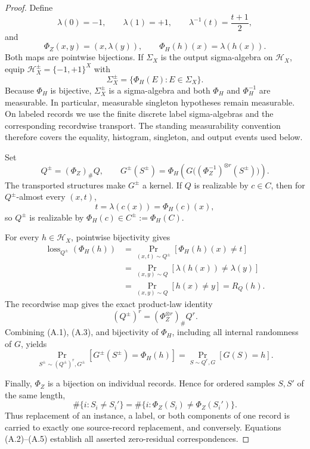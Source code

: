 \begin{proof}
Define
\[
\lambda(0)=-1,\qquad \lambda(1)=+1,\qquad
\lambda^{-1}(t)=\frac{t+1}{2},
\]
and
\[
\Phi_Z(x,y)=(x,\lambda(y)),\qquad
\Phi_H(h)(x)=\lambda(h(x)).
\]
Both maps are pointwise bijections.  If \(\Sigma_X\) is the output
sigma-algebra on \(\mathcal H_X\), equip
\(\mathcal H_X^\pm=\{-1,+1\}^X\) with
\[
\Sigma_X^\pm=\{\Phi_H(E):E\in\Sigma_X\}.
\]
Because \(\Phi_H\) is bijective, \(\Sigma_X^\pm\) is a sigma-algebra
and both \(\Phi_H\) and \(\Phi_H^{-1}\) are measurable.  In particular,
measurable singleton hypotheses remain measurable.  On labeled
records we use the finite discrete label sigma-algebras and the
corresponding recordwise transport.  The standing measurability
convention therefore covers the equality, histogram, singleton, and
output events used below.

Set
\[
Q^\pm=(\Phi_Z)_\#Q,\qquad
G^\pm(S^\pm)=
\Phi_H\!\left(
G\bigl((\Phi_Z^{-1})^{\otimes r}(S^\pm)\bigr)
\right).
\tag{A.1}
\]
The transported structures make \(G^\pm\) a kernel.  If \(Q\) is
realizable by \(c\in C\), then for \(Q^\pm\)-almost every \((x,t)\),
\[
t=\lambda(c(x))=\Phi_H(c)(x),
\]
so \(Q^\pm\) is realizable by
\(\Phi_H(c)\in C^\pm:=\Phi_H(C)\).

For every \(h\in\mathcal H_X\), pointwise bijectivity gives
\[
\begin{aligned}
\operatorname{loss}_{Q^\pm}(\Phi_H(h))
&=\Pr_{(x,t)\sim Q^\pm}[\Phi_H(h)(x)\neq t]\\
&=\Pr_{(x,y)\sim Q}[\lambda(h(x))\neq\lambda(y)]\\
&=\Pr_{(x,y)\sim Q}[h(x)\neq y]
=R_Q(h).
\end{aligned}
\tag{A.2}
\]
The recordwise map gives the exact product-law identity
\[
(Q^\pm)^r=(\Phi_Z^{\otimes r})_\#Q^r.
\tag{A.3}
\]
Combining (A.1), (A.3), and bijectivity of \(\Phi_H\), including all
internal randomness of \(G\), yields
\[
\Pr_{S^\pm\sim(Q^\pm)^r,G^\pm}
[G^\pm(S^\pm)=\Phi_H(h)]
=
\Pr_{S\sim Q^r,G}[G(S)=h].
\tag{A.4}
\]

Finally, \(\Phi_Z\) is a bijection on individual records.  Hence for
ordered samples \(S,S'\) of the same length,
\[
\#\{i:S_i\neq S_i'\}
=
\#\{i:\Phi_Z(S_i)\neq\Phi_Z(S_i')\}.
\tag{A.5}
\]
Thus replacement of an instance, a label, or both components of one
record is carried to exactly one source-record replacement, and
conversely.  Equations (A.2)--(A.5) establish all asserted
zero-residual correspondences.
\end{proof}

